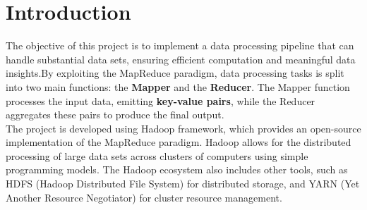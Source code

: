 \newpage
\section{Introduction}
The objective of this project is to implement a data processing pipeline that can handle substantial data sets, ensuring efficient computation and meaningful data insights.By exploiting the MapReduce paradigm, data processing tasks is split into two main functions: the \textbf{Mapper} and the \textbf{Reducer}.\newline
The Mapper function processes the input data, emitting \textbf{key-value pairs}, while the Reducer aggregates these pairs to produce the final output.\\

\noindent The project is developed using Hadoop framework, which provides an open-source implementation of the MapReduce paradigm. Hadoop allows for the distributed processing of large data sets across clusters of computers using simple programming models. The Hadoop ecosystem also includes other tools, such as HDFS (Hadoop Distributed File System) for distributed storage, and YARN (Yet Another Resource Negotiator) for cluster resource management.\newline



